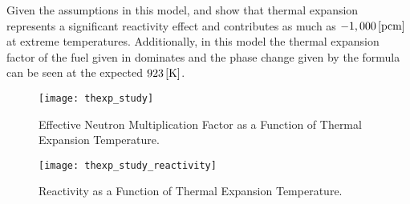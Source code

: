   Given the assumptions in this model,   and
   show that thermal 
  expansion represents a significant reactivity effect and contributes as much 
  as $-1,000 \left[\text{{pcm}}\right]$ at extreme temperatures. Additionally, in this model 
  the thermal expansion factor of the fuel given in  
  dominates and the phase change given by the formula can be seen at the 
  expected $923 \left[\text{{K}}\right]$.

  \begin{figure}
    \centering
    \texttt{[image: thexp\_study]}
    \caption{Effective Neutron Multiplication Factor as a Function of 
      Thermal Expansion Temperature.}
    \label{fig:thexp_study}
  \end{figure}

  \begin{figure}
    \centering
    \texttt{[image: thexp\_study\_reactivity]}
    \caption{Reactivity as a Function of Thermal Expansion Temperature.}
    \label{fig:thexp_study_reactivity}
  \end{figure}
